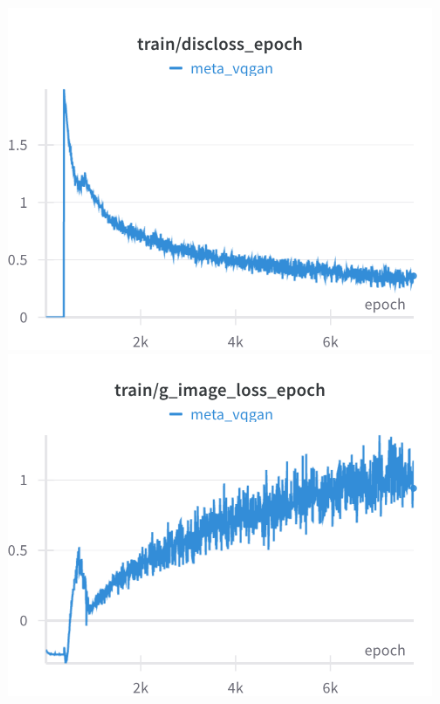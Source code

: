 \begin{figure}[H]
\includegraphics[width=\linewidth]{detailed_engineering/Meta VQGAN/charts/Section-2-Panel-8-hf6218kso}
\caption{}
\endminipage\hfill
{}
\includegraphics[width=\linewidth]{detailed_engineering/Meta VQGAN/charts/Section-2-Panel-9-5s6d83uz1}
\caption{}
\endminipage
\end{figure}

